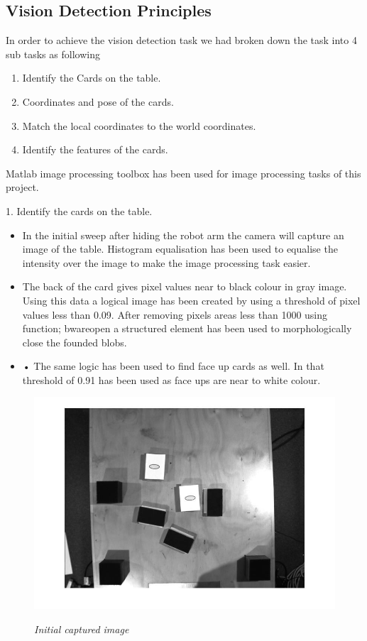 \subsection{Vision Detection Principles}
In order to achieve the vision detection task we had broken down the task into 4 sub tasks as following
\begin{enumerate}
	\item Identify the Cards on the table.
	\item Coordinates and pose of the cards.
	\item Match the local coordinates to the world coordinates.
	\item Identify the features of the cards.
\end{enumerate}
	
Matlab image processing toolbox has been used for image processing tasks of this project. 

1.	Identify the cards on the table.
\begin{itemize}
	\item In the initial sweep after hiding the robot arm the camera will capture an image of the table. Histogram equalisation has been used to equalise the intensity over the image to make the image processing task easier. 
	\item The back of the card gives pixel values near to black colour in gray image. Using this data a logical image has been created by using a threshold of pixel values less than 0.09. After removing pixels areas less than 1000 using function; bwareopen a structured element has been used to morphologically close the founded blobs.
	\item •	The same logic has been used to find face up cards as well. In that threshold of 0.91 has been used as face ups are near to white colour.
\end{itemize}

\begin{figure}[position = here]
	\begin{centering}
		\includegraphics[scale=0.3]{./sachiths_images/image3.png}\\
		\caption[]{\textit{Initial captured image}}
	\end{centering}
\end{figure}

